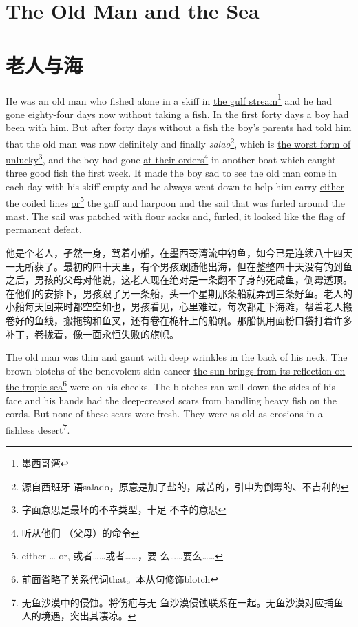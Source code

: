 \begin{paracol}{2}
\section{The Old Man and the Sea}

\switchcolumn

\section*{老人与海}

\switchcolumn*

He was an old man who fished alone in a \gls{skiff} in \uline{the \Gls{gulf}
  \Gls{stream}}\footnote{墨西哥湾} and he had gone eighty-four days now without
taking a fish. In the first forty days a boy had been with him. But after
forty days without a fish the boy's parents had told him that the old man
was now \gls{definitely} and finally \emph{salao}\footnote{源自西班牙
  语salado，原意是加了盐的，咸苦的，引申为倒霉的、不吉利的}, which is
\uline{the worst \gls{form} of unlucky}\footnote{字面意思是最坏的不幸类型，十足
  不幸的意思}, and the boy had gone \uline{at their orders}\footnote{听从他们
  （父母）的命令} in another boat which caught three good fish the first
week. It made the boy sad to see the old man come in each day with his
skiff empty and he always went down to help him carry \uline{either} the
\gls{coiled} lines \uline{or}\footnote{either \ldots{} or, 或者……或者……，要
  么……要么……} the \gls{gaff} and \gls{harpoon} and the \gls{sail} that was
\gls{furled} around the \gls{mast}. The sail was patched with \gls{flour}
\glspl{sack} and, \gls{furled}, it looked like the flag of \gls{permanent} \gls{defeat}.

\switchcolumn

他是个老人，孑然一身，驾着小船，在墨西哥湾流中钓鱼，如今已是连续八十四天一无所获了。最初的四十天里，有个男孩跟随他出海，但在整整四十天没有钓到鱼之后，男孩的父母对他说，这老人现在绝对是一条翻不了身的死咸鱼，倒霉透顶。在他们的安排下，男孩跟了另一条船，头一个星期那条船就弄到三条好鱼。老人的小船每天回来时都空空如也，男孩看见，心里难过，每次都走下海滩，帮着老人搬卷好的鱼线，搬拖钩和鱼叉，还有卷在桅杆上的船帆。那船帆用面粉口袋打着许多补丁，卷拢着，像一面永恒失败的旗帜。

\switchcolumn*

The old man was thin and \gls{gaunt} with deep \glspl{wrinkle} in the back
of his neck. The brown \glspl{blotch} of the \gls{benevolent} \gls{skin}
cancer \uline{the sun \glspl{bring} from its \gls{reflection} on the
  \gls{tropic} sea}\footnote{前面省略了关系代词that。本从句修饰blotch} were
on his \glspl{cheek}. The blotches ran well down the sides of his face and his
hands had the \gls{deep-creased} \glspl{scar} from handling heavy fish on
the \glspl{cord}. But none of these scars were fresh. They were \gls{as} old
as \glspl{erosion} in a fishless desert\footnote{无鱼沙漠中的侵蚀。将伤疤与无
  鱼沙漠侵蚀联系在一起。无鱼沙漠对应捕鱼人的境遇，突出其凄凉。}.


\end{paracol}
